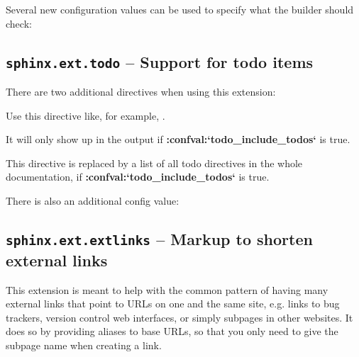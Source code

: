 \documentclass[letterpaper,10pt,english]{sphinxmanual}
\begin{document}
Several new configuration values can be used to specify what the builder
should check:


\subsection{\texttt{sphinx.ext.todo} -- Support for todo items}
\label{ext/todo:sphinx-ext-todo-support-for-todo-items}\label{ext/todo:module-sphinx.ext.todo}\label{ext/todo::doc}

There are two additional directives when using this extension:

\begin{fulllineitems}
\label{ext/todo:directive-todo}
Use this directive like, for example, {\hyperref[markup/para:directive\string-note]{}}.

It will only show up in the output if {\color{red}\bfseries{}:confval:{}`todo\_include\_todos{}`} is true.

\end{fulllineitems}


\begin{fulllineitems}
\label{ext/todo:directive-todolist}
This directive is replaced by a list of all todo directives in the whole
documentation, if {\color{red}\bfseries{}:confval:{}`todo\_include\_todos{}`} is true.

\end{fulllineitems}


There is also an additional config value:


\subsection{\texttt{sphinx.ext.extlinks} -- Markup to shorten external links}
\label{ext/extlinks:sphinx-ext-extlinks-markup-to-shorten-external-links}\label{ext/extlinks:module-sphinx.ext.extlinks}\label{ext/extlinks::doc}

This extension is meant to help with the common pattern of having many external
links that point to URLs on one and the same site, e.g. links to bug trackers,
version control web interfaces, or simply subpages in other websites.  It does
so by providing aliases to base URLs, so that you only need to give the subpage
name when creating a link.
\end{document}
